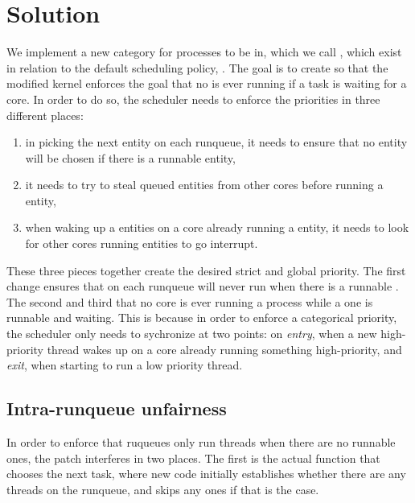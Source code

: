 \section{Solution}\label{s:maybe-solution}

We implement a new category for processes to be in, which we call \schedbe{},
which exist in relation to the default scheduling policy, \schednormal{}. The
goal is to create \schedbe{} so that the modified kernel enforces the goal that
no \schedbe{} is ever running if a \schednormal{} task is waiting for a core. In
order to do so, the scheduler needs to enforce the priorities in three different
places:
\begin{enumerate}
    \item in picking the next entity on each runqueue, it needs to ensure that
no \schedbe{} entity will be chosen if there is a runnable \schednormal{}
entity,
    \item it needs to try to steal queued \schednormal{} entities from other cores
before running a \schedbe{} entity,
    \item when waking up a \schednormal{} entities on a core already running a
    \schednormal{} entity, it needs to look for other cores running \schedbe{}
    entities to go interrupt.
\end{enumerate}

These three pieces together create the desired strict and global priority. The
first change ensures that on each runqueue \schedbe{} will never run when there
is a runnable \schednormal{}. The second and third that no core is ever running
a \schedbe{} process while a \schednormal{} one is runnable and waiting. This is
because in order to enforce a categorical priority, the scheduler only needs to
sychronize at two points: on \textit{entry}, when a new high-priority thread
wakes up on a core already running something high-priority, and \textit{exit},
when starting to run a low priority thread.

\subsection{Intra-runqueue unfairness}

In order to enforce that ruqueues only run \schedbe{} threads when there are no
runnable \schednormal{} ones, the patch interferes in two places. The first is
the actual function that chooses the next task, where new code initially
establishes whether there are any \schednormal{} threads on the runqueue, and
skips any \schedbe{} ones if that is the case. 

